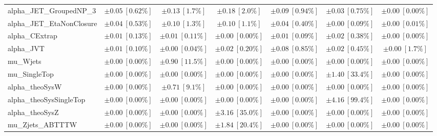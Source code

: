 \begin{sidewaystable}
\begin{center}
\begin{tabular*}{\textwidth}{@{\extracolsep{\fill}}lcccccc}
alpha\_JET\_GroupedNP\_3         & $\pm 0.05\ [0.62\%] $          & $\pm 0.13\ [1.7\%] $          & $\pm 0.18\ [2.0\%] $          & $\pm 0.09\ [0.94\%] $          & $\pm 0.03\ [0.75\%] $          & $\pm 0.00\ [0.00\%] $       \\
alpha\_JET\_EtaNonClosure         & $\pm 0.04\ [0.53\%] $          & $\pm 0.10\ [1.3\%] $          & $\pm 0.10\ [1.1\%] $          & $\pm 0.04\ [0.40\%] $          & $\pm 0.00\ [0.09\%] $          & $\pm 0.00\ [0.01\%] $       \\
alpha\_CExtrap         & $\pm 0.01\ [0.13\%] $          & $\pm 0.01\ [0.11\%] $          & $\pm 0.00\ [0.00\%] $          & $\pm 0.01\ [0.09\%] $          & $\pm 0.02\ [0.38\%] $          & $\pm 0.00\ [0.00\%] $       \\
alpha\_JVT         & $\pm 0.01\ [0.10\%] $          & $\pm 0.00\ [0.04\%] $          & $\pm 0.02\ [0.20\%] $          & $\pm 0.08\ [0.85\%] $          & $\pm 0.02\ [0.45\%] $          & $\pm 0.00\ [1.7\%] $       \\
mu\_Wjets         & $\pm 0.00\ [0.00\%] $          & $\pm 0.90\ [11.5\%] $          & $\pm 0.00\ [0.00\%] $          & $\pm 0.00\ [0.00\%] $          & $\pm 0.00\ [0.00\%] $          & $\pm 0.00\ [0.00\%] $       \\
mu\_SingleTop         & $\pm 0.00\ [0.00\%] $          & $\pm 0.00\ [0.00\%] $          & $\pm 0.00\ [0.00\%] $          & $\pm 0.00\ [0.00\%] $          & $\pm 1.40\ [33.4\%] $          & $\pm 0.00\ [0.00\%] $       \\
alpha\_theoSysW         & $\pm 0.00\ [0.00\%] $          & $\pm 0.71\ [9.1\%] $          & $\pm 0.00\ [0.00\%] $          & $\pm 0.00\ [0.00\%] $          & $\pm 0.00\ [0.00\%] $          & $\pm 0.00\ [0.00\%] $       \\
alpha\_theoSysSingleTop         & $\pm 0.00\ [0.00\%] $          & $\pm 0.00\ [0.00\%] $          & $\pm 0.00\ [0.00\%] $          & $\pm 0.00\ [0.00\%] $          & $\pm 4.16\ [99.4\%] $          & $\pm 0.00\ [0.00\%] $       \\
alpha\_theoSysZ         & $\pm 0.00\ [0.00\%] $          & $\pm 0.00\ [0.00\%] $          & $\pm 3.16\ [35.0\%] $          & $\pm 0.00\ [0.00\%] $          & $\pm 0.00\ [0.00\%] $          & $\pm 0.00\ [0.00\%] $       \\
mu\_Zjets\_ABTTTW         & $\pm 0.00\ [0.00\%] $          & $\pm 0.00\ [0.00\%] $          & $\pm 1.84\ [20.4\%] $          & $\pm 0.00\ [0.00\%] $          & $\pm 0.00\ [0.00\%] $          & $\pm 0.00\ [0.00\%] $       \\

\end{tabular*}
\end{center}
\end{sidewaystable}
